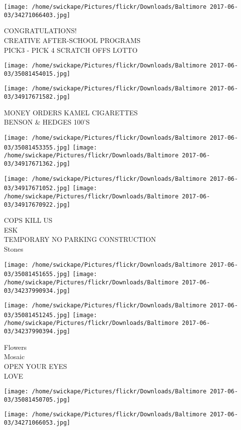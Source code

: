\documentclass[10pt,letterpaper]{article}
\begin{document}
\texttt{[image: /home/swickape/Pictures/flickr/Downloads/Baltimore 2017-06-03/34271066403.jpg]}

CONGRATULATIONS!\\
CREATIVE AFTER{-}SCHOOL PROGRAMS\\
PICK3 {-} PICK 4 SCRATCH OFFS LOTTO
\pagebreak

\texttt{[image: /home/swickape/Pictures/flickr/Downloads/Baltimore 2017-06-03/35081454015.jpg]}

\vspace{0.25in}
\texttt{[image: /home/swickape/Pictures/flickr/Downloads/Baltimore 2017-06-03/34917671582.jpg]}

MONEY ORDERS KAMEL CIGARETTES\\
BENSON \& HEDGES 100'S
\pagebreak

\texttt{[image: /home/swickape/Pictures/flickr/Downloads/Baltimore 2017-06-03/35081453355.jpg]}
\texttt{[image: /home/swickape/Pictures/flickr/Downloads/Baltimore 2017-06-03/34917671362.jpg]}

\texttt{[image: /home/swickape/Pictures/flickr/Downloads/Baltimore 2017-06-03/34917671052.jpg]}
\texttt{[image: /home/swickape/Pictures/flickr/Downloads/Baltimore 2017-06-03/34917670922.jpg]}

COPS KILL US\\
ESK\\
TEMPORARY NO PARKING CONSTRUCTION\\
Stones
\pagebreak

\texttt{[image: /home/swickape/Pictures/flickr/Downloads/Baltimore 2017-06-03/35081451655.jpg]}
\texttt{[image: /home/swickape/Pictures/flickr/Downloads/Baltimore 2017-06-03/34237990934.jpg]}

\texttt{[image: /home/swickape/Pictures/flickr/Downloads/Baltimore 2017-06-03/35081451245.jpg]}
\texttt{[image: /home/swickape/Pictures/flickr/Downloads/Baltimore 2017-06-03/34237990394.jpg]}

Flowers\\
Mosaic\\
OPEN YOUR EYES\\
LOVE
\pagebreak

\texttt{[image: /home/swickape/Pictures/flickr/Downloads/Baltimore 2017-06-03/35081450705.jpg]}

\vspace{0.25in}
\texttt{[image: /home/swickape/Pictures/flickr/Downloads/Baltimore 2017-06-03/34271066053.jpg]}
\end{document}
